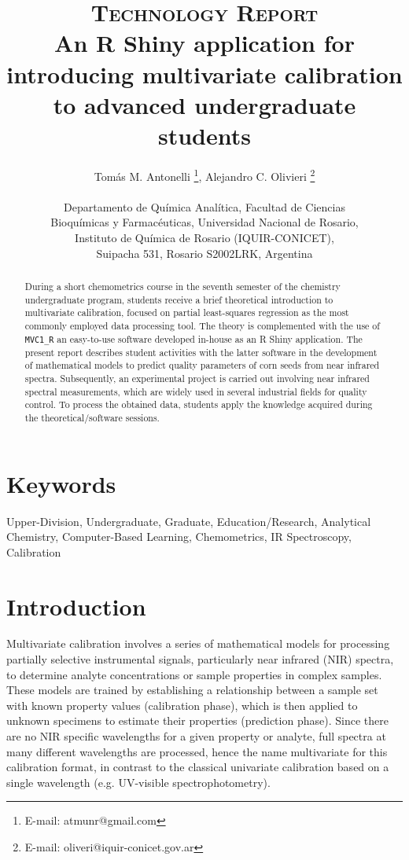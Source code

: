 \documentclass[10pt,twocolumn]{article}
\title{
	\usefont{OT1}{bch}{b}{n}
	\normalfont \normalsize \textsc{Technology Report} \\ [10pt]
	\huge{
		An R Shiny application for introducing multivariate calibration to
		advanced undergraduate students
	}
}
\author{
	Tom\'as M. Antonelli
	\footnote{E-mail: atmunr@gmail.com},
	Alejandro C. Olivieri
	\footnote{E-mail: oliveri@iquir-conicet.gov.ar}
	\\ \\
	Departamento de Qu\'imica Anal\'itica, Facultad de Ciencias \\
	Bioqu\'imicas y Farmac\'euticas, Universidad Nacional de Rosario, \\
	Instituto de Qu\'imica de Rosario (IQUIR-CONICET), \\
	Suipacha 531, Rosario S2002LRK, Argentina
}
\date{}
\begin{document}
\maketitle

\begin{abstract} During a short chemometrics course in the seventh semester of
the chemistry undergraduate program, students receive a brief theoretical
introduction to multivariate calibration, focused on partial least-squares
regression as the most commonly employed data processing tool. The theory is
complemented with the use of \texttt{MVC1\_R} an easy-to-use software developed
in-house as an R Shiny application. The present report describes student
activities with the latter software in the development of mathematical models to
predict quality parameters of corn seeds from near infrared spectra.
Subsequently, an experimental project is carried out involving near infrared
spectral measurements, which are widely used in several industrial fields for
quality control. To process the obtained data, students apply the knowledge
acquired during the theoretical/software sessions.
\end{abstract}

\newpage

\section*{Keywords}
Upper-Division, Undergraduate, Graduate, Education/Research, Analytical
Chemistry, Computer-Based Learning, Chemometrics, IR Spectroscopy, Calibration


\section*{Introduction}
Multivariate calibration involves a series of mathematical models for processing
partially selective instrumental signals, particularly near infrared (NIR)
spectra,\cite{pasquini18} to determine analyte concentrations or sample
properties in complex samples. These models are trained by establishing a
relationship between a sample set with known property values (calibration
phase), which is then applied to unknown specimens to estimate their properties
(prediction phase). Since there are no NIR specific wavelengths for a given
property or analyte, full spectra at many different wavelengths are processed,
hence the name multivariate for this calibration format, in contrast to the
classical univariate calibration based on a single wavelength (e.g. UV-visible
spectrophotometry).
\end{document}
